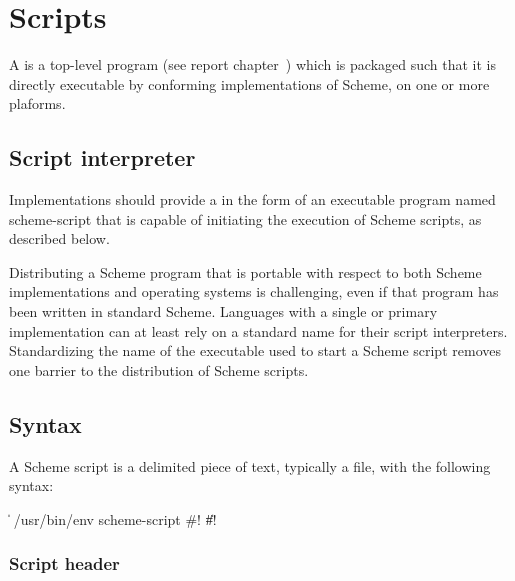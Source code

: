 \chapter{Scripts}
\label{scriptappendix}

A  is a top-level program 
(see report chapter~) which is packaged such that 
it is directly executable by conforming implementations of Scheme, on 
one or more plaforms.

\section{Script interpreter}

Implementations should provide a  in 
the form of an executable program named {\cf scheme-script} that is 
capable of initiating the execution of Scheme scripts, as described 
below.

\begin{rationale}
Distributing a Scheme program that is portable with respect to both 
Scheme implementations and operating systems is challenging, even 
if that program has been written in standard Scheme.  Languages with 
a single or primary implementation can at least rely on a standard 
name for their script interpreters.  Standardizing the name of the 
executable used to start a Scheme script removes one barrier to the 
distribution of Scheme scripts.
\end{rationale}

\section{Syntax}
\label{scriptsyntaxsection}

A Scheme script is a delimited piece of text, typically a file, with 
the following syntax:

\begin{grammar}
 \:  
  \> \| 
 \:  /usr/bin/env  
  \> scheme-script 
 \: \#! \| \#! 
\end{grammar}

\subsection{Script header}

